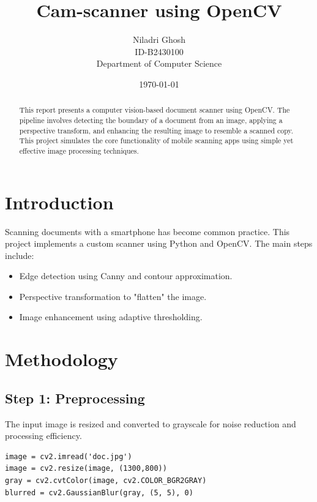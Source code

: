 \documentclass[12pt]{article}
\title{\textbf{Cam-scanner using OpenCV}}
\author{Niladri Ghosh \\
ID-B2430100 \\
Department of Computer Science}
\date{\today}
\begin{document}
\maketitle

\begin{abstract}
This report presents a computer vision-based document scanner using OpenCV. The pipeline involves detecting the boundary of a document from an image, applying a perspective transform, and enhancing the resulting image to resemble a scanned copy. This project simulates the core functionality of mobile scanning apps using simple yet effective image processing techniques.
\end{abstract}

\section{Introduction}
Scanning documents with a smartphone has become common practice. This project implements a custom scanner using Python and OpenCV. The main steps include:
\begin{itemize}
    \item Edge detection using Canny and contour approximation.
    \item Perspective transformation to "flatten" the image.
    \item Image enhancement using adaptive thresholding.
\end{itemize}

\section{Methodology}

\subsection{Step 1: Preprocessing}
The input image is resized and converted to grayscale for noise reduction and processing efficiency.

\begin{verbatim}
image = cv2.imread('doc.jpg')
image = cv2.resize(image, (1300,800))
gray = cv2.cvtColor(image, cv2.COLOR_BGR2GRAY)
blurred = cv2.GaussianBlur(gray, (5, 5), 0)
\end{verbatim}
\end{document}
